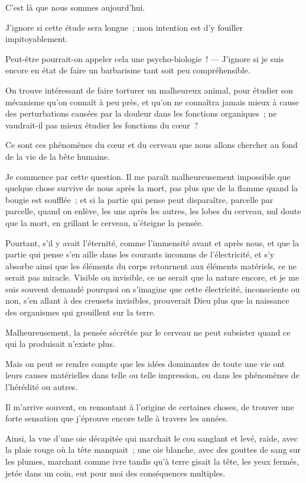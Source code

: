 \documentclass[french,twoside]{book} %
\begin{document}
\noindent C’est là que nous sommes aujourd’hui.\par
J’ignore si cette étude sera longue ; mon intention est d’y fouiller impitoyablement.\par
Peut-être pourrait-on appeler cela une psycho-biologie ! — J’ignore si je suis encore en état de faire un barbarisme tant soit peu compréhensible.\par
On trouve intéressant de faire torturer un malheureux animal, pour étudier son mécanisme  qu’on connaît à peu près, et qu’on ne connaîtra jamais mieux à cause des perturbations causées par la douleur dans les fonctions organiques ; ne vaudrait-il pas mieux étudier les fonctions du cœur ?\par
Ce sont ces phénomènes du cœur et du cerveau que nous allons chercher au fond de la vie de la bête humaine.\par
Je commence par cette question. Il me paraît malheureusement impossible que quelque chose survive de nous après la mort, pas plus que de la flamme quand la bougie est soufflée ; et si la partie qui pense peut disparaître, parcelle par parcelle, quand on enlève, les uns après les autres, les lobes du cerveau, nul doute que la mort, en grillant le cerveau, n’éteigne la pensée.\par
Pourtant, s’il y avait l’éternité, comme l’immensité avant et après nous, et que la partie qui pense s’en aille dans les courants inconnus de l’électricité, et s’y absorbe ainsi que les éléments du corps retournent aux éléments matériels, ce ne serait pas miracle. Visible ou invisible, ce ne serait que la nature encore, et je me suis souvent demandé pourquoi on s’imagine que cette électricité, inconsciente ou non, s’en allant à des creusets invisibles, prouverait  Dieu plus que la naissance des organismes qui grouillent sur la terre.\par
Malheureusement, la pensée sécrétée par le cerveau ne peut subsister quand ce qui la produisait n’existe plus.\par
Mais on peut se rendre compte que les idées dominantes de toute une vie ont leurs causes matérielles dans telle ou telle impression, ou dans les phénomènes de l’hérédité ou autres.\par
Il m’arrive souvent, en remontant à l’origine de certaines choses, de trouver une forte sensation que j’éprouve encore telle à travers les années.\par
Ainsi, la vue d’une oie décapitée qui marchait le cou sanglant et levé, raide, avec la plaie rouge où la tête manquait ; une oie blanche, avec des gouttes de sang sur les plumes, marchant comme ivre tandis qu’à terre gisait la tête, les yeux fermés, jetée dans un coin, eut pour moi des conséquences multiples.\par
\end{document}
